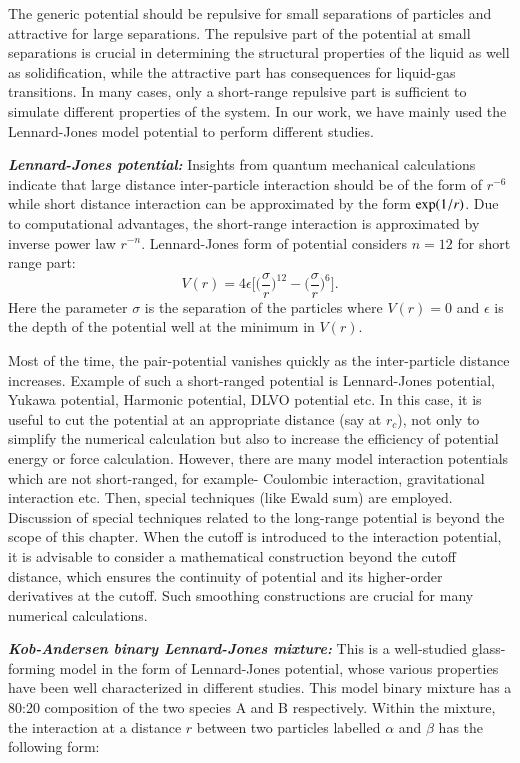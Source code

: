The generic potential should be repulsive for small separations of particles and attractive for large separations. The repulsive part of the potential at small separations is crucial in determining the structural properties of the liquid as well as solidification, while the attractive part has consequences for liquid-gas transitions. In many cases, only a short-range repulsive part is sufficient to simulate different properties of the system. In our work, we have mainly used the {Lennard-Jones model potential} to perform different studies.
    
    {\bf \em Lennard-Jones potential:} Insights from quantum mechanical calculations indicate that large distance inter-particle interaction should be of the form of $r^{-6}$ while short distance interaction can be approximated by the form ${\rm exp}(1/r)$. Due to computational advantages, the short-range interaction is approximated by inverse power law $r^{-n}$. Lennard-Jones form of potential considers $n=12$ for short range part:
    \begin{equation}
    V(r)= 4\epsilon \Bigg[\Big(\frac{\sigma}{r}   \Big)^{12} -\Big(\frac{\sigma}{r}   \Big)^6  \Bigg].
    \end{equation}
    Here the parameter $\sigma$ is the separation of the particles where $V(r)=0$ and $\epsilon$ is the depth of the potential well at the minimum in $V(r)$.
    
    Most of the time, the pair-potential vanishes quickly as the inter-particle distance increases. Example of such a short-ranged potential is Lennard-Jones potential, Yukawa potential, Harmonic potential, DLVO potential etc. In this case, it is useful to cut the potential at an appropriate distance (say at $r_c$), not only to simplify the numerical calculation but also to increase the efficiency of potential energy or force calculation. However, there are many model interaction potentials which are not short-ranged, for example- Coulombic interaction, gravitational interaction etc. Then, special techniques (like Ewald sum) are employed. Discussion of special techniques related to the long-range potential is beyond the scope of this chapter. When the cutoff is introduced to the interaction potential, it is advisable to consider a mathematical construction beyond the cutoff distance, which ensures the continuity of potential and its higher-order derivatives at the cutoff. Such smoothing constructions are crucial for many numerical calculations.

{\bf \em Kob-Andersen binary Lennard-Jones mixture:} This is a well-studied glass-forming model \cite{Kob94} in the form of Lennard-Jones potential, whose various properties have been well characterized in different studies. This model binary mixture has a 80:20 composition of the two species A and B respectively. Within the mixture, the interaction at a distance $r$ between two particles labelled $\alpha$ and $\beta$ has the following form:

